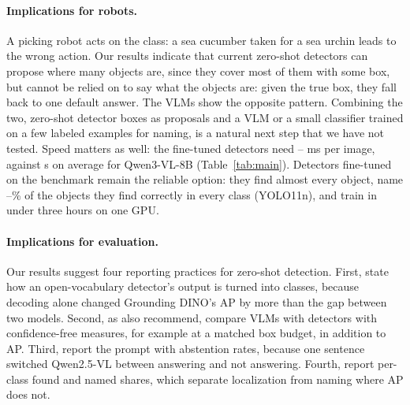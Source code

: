 \documentclass[letterpaper]{article} %
\begin{document}
\paragraph{Implications for robots.}
A picking robot acts on the class: a sea cucumber taken for a sea urchin leads to the wrong action. Our results indicate that current zero-shot detectors can propose where many objects are, since they cover most of them with some box, but cannot be relied on to say what the objects are: given the true box, they fall back to one default answer. The VLMs show the opposite pattern. Combining the two, zero-shot detector boxes as proposals and a VLM or a small classifier trained on a few labeled examples for naming, is a natural next step that we have not tested. Speed matters as well: the fine-tuned detectors need \msYoloMin--\msYoloMax{} ms per image, against \secQwenVLmean{} s on average for Qwen3-VL-8B (Table~\ref{tab:main}). Detectors fine-tuned on the benchmark remain the reliable option: they find almost every object, name \namedOfFoundMinYoloN--\namedOfFoundMaxYoloN\% of the objects they find correctly in every class (YOLO11n), and train in under three hours on one GPU.

\paragraph{Implications for evaluation.}
Our results suggest four reporting practices for zero-shot detection. First, state how an open-vocabulary detector's output is turned into classes, because decoding alone changed Grounding DINO's AP by more than the gap between two models. Second, as \citet{li2025aerialmlm} also recommend, compare VLMs with detectors with confidence-free measures, for example at a matched box budget, in addition to AP. Third, report the prompt with abstention rates, because one sentence switched Qwen2.5-VL between answering and not answering. Fourth, report per-class found and named shares, which separate localization from naming where AP does not.
\end{document}
